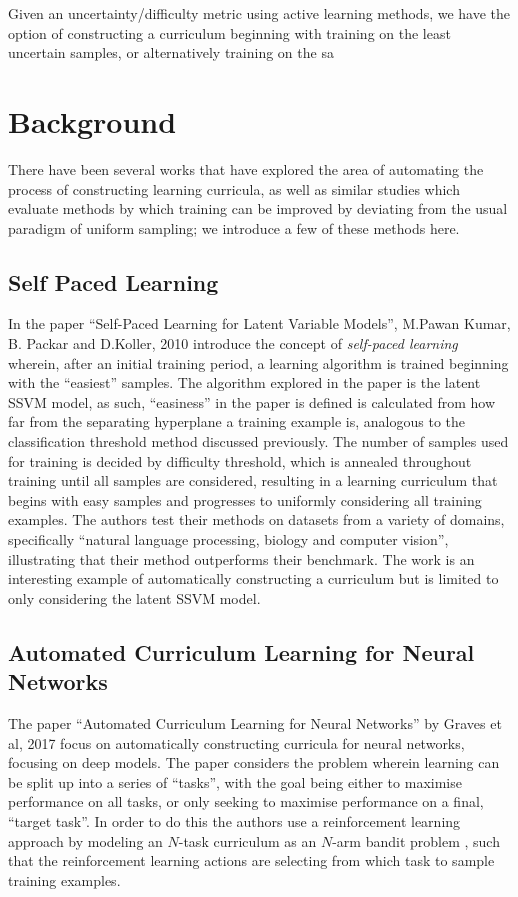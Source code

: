 \documentclass[a4paper,10.5pt]{article}
\begin{document}
Given an uncertainty/difficulty metric using active learning methods, we have the option of constructing a curriculum beginning with training on the least uncertain samples, or alternatively training on the sa 

\section{Background}
There have been several works that have explored the area of automating the process of constructing learning curricula, as well as similar studies which evaluate methods by which training can be improved by deviating from the usual paradigm of uniform sampling; we introduce a few of these methods here.
\subsection*{Self Paced Learning}
In the paper ``Self-Paced Learning for Latent Variable Models'', M.Pawan Kumar, B. Packar and D.Koller, 2010 \cite{Koller 2010} introduce the concept of \textit{self-paced learning} wherein, after an initial training period, a learning algorithm is trained beginning with the ``easiest'' samples. The algorithm explored in the paper is the latent SSVM model, as such, ``easiness'' in the paper is defined is calculated from how far from the separating hyperplane a training example is, analogous to the classification threshold method discussed previously. The number of samples used for training is decided by difficulty threshold, which is annealed throughout training until all samples are considered, resulting in a learning curriculum that begins with easy samples and progresses to uniformly considering all training examples. The authors test their methods on datasets from a variety of domains, specifically ``natural language processing, biology and computer vision'', illustrating that their method outperforms their benchmark. The work is an interesting example of automatically constructing a curriculum but is limited to only considering the latent SSVM model.
\subsection*{Automated Curriculum Learning for Neural Networks}
The paper ``Automated Curriculum Learning for Neural Networks'' by Graves et al, 2017 \cite{Graves 2017} focus on automatically constructing curricula for neural networks, focusing on deep models. The paper considers the problem wherein learning can be split up into a series of ``tasks'', with the goal being either to maximise performance on all tasks, or only seeking to maximise performance on a final, ``target task''. In order to do this the authors use a reinforcement learning approach by modeling an $N$-task curriculum as an $N$-arm bandit problem \cite{Bubeck 2012}, such that the reinforcement learning actions are selecting from which task to sample training examples. 
\end{document}
